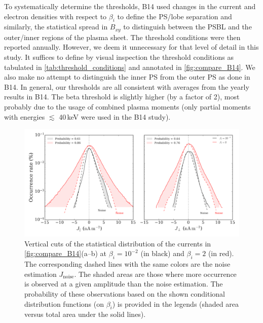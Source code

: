 \documentclass[draft]{agujournal2019}
\begin{document}
To systematically determine the thresholds, B14 used changes in the current and electron densities with respect to $\beta_i$ to define the PS/lobe separation and similarly, the statistical spread in $B_{xy}$ to distinguish between the PSBL and the outer/inner regions of the plasma sheet. The threshold conditions were then reported annually. However, we deem it unnecessary for that level of detail in this study. It suffices to define by visual inspection the threshold conditions as tabulated in \cref{tab:threshold_conditions} and annotated in \cref{fig:compare_B14}. We also make no attempt to distinguish the inner PS from the outer PS as done in B14. In general, our thresholds are all consistent with averages from the yearly results in B14. The beta threshold is slightly higher (by a factor of 2), most probably due to the usage of combined plasma moments (only partial moments with energies $\lesssim$ 40\,\si{keV} were used in the B14 study).

\begin{figure}
\centering
\noindent\includegraphics[width=\textwidth]{Fig4_J_slices.pdf}
\caption{
    Vertical cuts of the statistical distribution of the currents in \cref{fig:compare_B14}(a--b) at ${\beta_i=10^{-2}}$ (in black) and ${\beta_i=2}$ (in red). The corresponding dashed lines with the same colors are the noise estimation $J_\text{noise}$. The shaded areas are those where more occurrence is observed at a given amplitude than the noise estimation. The probability of these observations based on the shown conditional distribution functions (on $\beta_i$) is provided in the legends (shaded area versus total area under the solid lines).
}
\label{fig:J_slices}
\end{figure}
\end{document}
